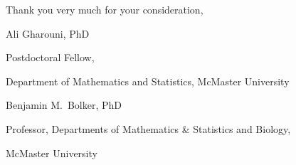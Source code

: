 \documentclass[12pt,letterpaper]{letter}
\begin{document}
Thank you very much for your consideration,

\begin{flushleft}
\footnotesize

Ali Gharouni, PhD
\setlength{\parskip}{0em}

Postdoctoral Fellow, 

Department of Mathematics and Statistics, McMaster University

\vspace{1em}

Benjamin M.\ Bolker, PhD

Professor, Departments of Mathematics \& Statistics and Biology, 

McMaster University

\end{flushleft}

\thispagestyle{empty}
\end{document}
